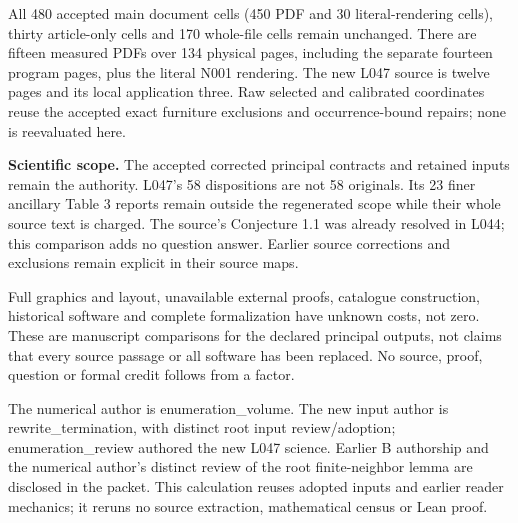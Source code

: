 \documentclass[11pt,a4paper]{article}
\begin{document}
All 480 accepted main document cells (450 PDF and 30 literal-rendering cells), thirty article-only cells and 170 whole-file cells remain unchanged. There are fifteen measured PDFs over 134 physical pages, including the separate fourteen program pages, plus the literal N001 rendering. The new L047 source is twelve pages and its local application three. Raw selected and calibrated coordinates reuse the accepted exact furniture exclusions and occurrence-bound repairs; none is reevaluated here.

\textbf{Scientific scope.} The accepted corrected principal contracts and retained inputs remain the authority. L047's 58 dispositions are not 58 originals. Its 23 finer ancillary Table 3 reports remain outside the regenerated scope while their whole source text is charged. The source's Conjecture 1.1 was already resolved in L044; this comparison adds no question answer. Earlier source corrections and exclusions remain explicit in their source maps.

Full graphics and layout, unavailable external proofs, catalogue construction, historical software and complete formalization have unknown costs, not zero. These are manuscript comparisons for the declared principal outputs, not claims that every source passage or all software has been replaced. No source, proof, question or formal credit follows from a factor.

The numerical author is enumeration\_volume. The new input author is rewrite\_termination, with distinct root input review/adoption; enumeration\_review authored the new L047 science. Earlier B authorship and the numerical author's distinct review of the root finite-neighbor lemma are disclosed in the packet. This calculation reuses adopted inputs and earlier reader mechanics; it reruns no source extraction, mathematical census or Lean proof.
\end{document}
